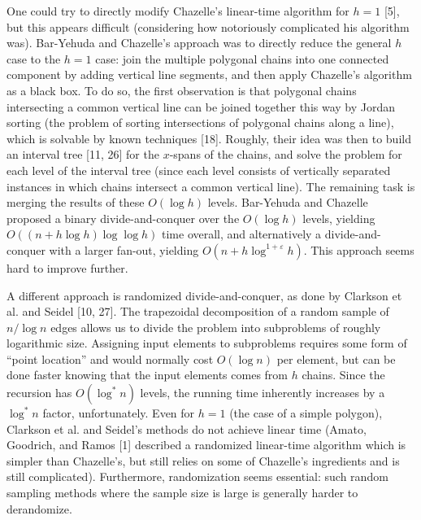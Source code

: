 \documentclass[10pt,a4paper]{article}
\begin{document}
One could try to directly modify Chazelle’s linear-time algorithm for $h=1$ [5], but this appears difficult (considering how notoriously complicated his algorithm was). Bar-Yehuda and Chazelle’s approach was to directly reduce the general $h$ case to the $h=1$ case: join the multiple polygonal chains into one connected component by adding vertical line segments, and then apply Chazelle’s algorithm as a black box. To do so, the first observation is that polygonal chains intersecting a common vertical line can be joined together this way by Jordan sorting (the problem of sorting intersections of polygonal chains along a line), which is solvable by known techniques [18]. Roughly, their idea was then to build an interval tree [11, 26] for the $x$-spans of the chains, and solve the problem for each level of the interval tree (since each level consists of vertically separated instances in which chains intersect a common vertical line). The remaining task is merging the results of these $O(\log h)$ levels. Bar-Yehuda and Chazelle proposed a binary divide-and-conquer over the $O(\log h)$ levels, yielding $O((n+h\log h)\log\log h)$ time overall, and alternatively a divide-and-conquer with a larger fan-out, yielding $O(n+h\log^{1+\varepsilon}h)$. This approach seems hard to improve further.
\par
\par
A different approach is randomized divide-and-conquer, as done by Clarkson et al. and Seidel [10, 27]. The trapezoidal decomposition of a random sample of $n/\log n$ edges allows us to divide the problem into subproblems of roughly logarithmic size. Assigning input elements to subproblems requires some form of “point location” and would normally cost $O(\log n)$ per element, but can be done faster knowing that the input elements comes from $h$ chains. Since the recursion has $O(\log^{*}n)$ levels, the running time inherently increases by a $\log^{*}n$ factor, unfortunately. Even for $h=1$ (the case of a simple polygon), Clarkson et al. and Seidel’s methods do not achieve linear time (Amato, Goodrich, and Ramos [1] described a randomized linear-time algorithm which is simpler than Chazelle’s, but still relies on some of Chazelle’s ingredients and is still complicated). Furthermore, randomization seems essential: such random sampling methods where the sample size is large is generally harder to derandomize.
\par
\par
\end{document}
